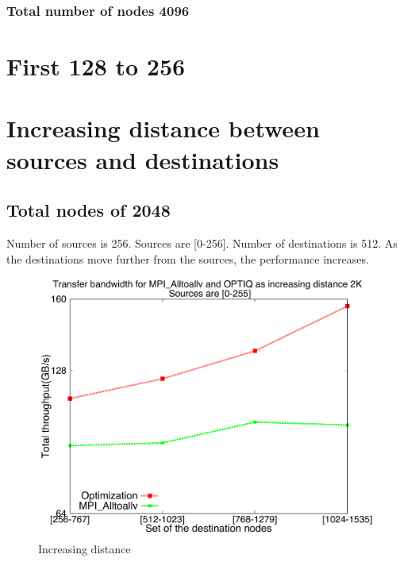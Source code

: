 \documentclass[letter]{article}
\begin{document}
\clearpage
\newpage

\subsubsection {Total number of nodes 4096}



\clearpage
\newpage

\section{First 128 to 256}

\section {Increasing distance between sources and destinations}

\subsection{Total nodes of 2048}

Number of sources is 256. Sources are [0-256]. Number of destinations is 512. As the destinations move further from the sources, the performance increases.

\begin{figure}[h]
\vspace{-0.1in}
\centering
\includegraphics[scale=0.40]{report_figures/incrdist/incrdist_2k.pdf}
\vspace{-0.1in}
\caption{Increasing distance}
\vspace{-0.1in}
\label{fig:incrdist_2k}
\end{figure}
\end{document}
